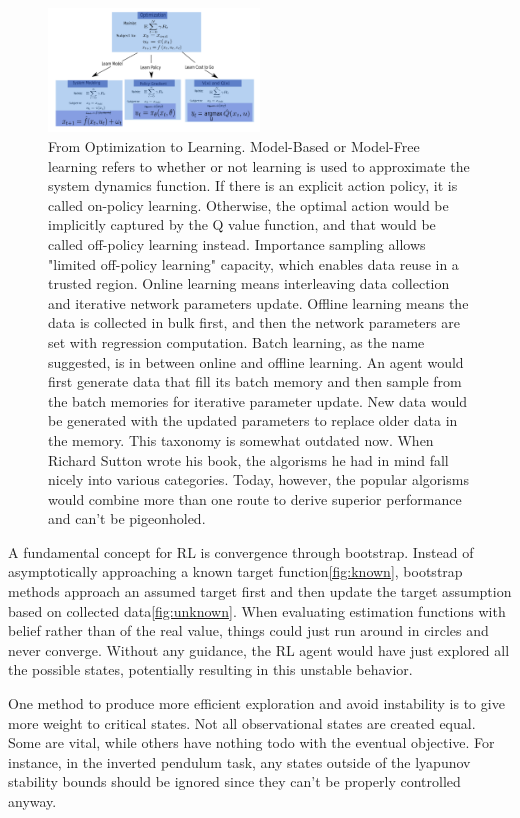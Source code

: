\documentclass[journal]{IEEEtran}
\begin{document}
\begin{figure}
    \centering
    \includegraphics[width=0.5\textwidth]{Control.png}
    \caption{From Optimization to Learning. Model-Based or Model-Free learning refers to whether or not learning is used to approximate the system dynamics function. If there is an explicit action policy, it is called on-policy learning. Otherwise, the optimal action would be implicitly captured by the Q value function, and that would be called off-policy learning instead. Importance sampling allows "limited off-policy learning" capacity, which enables data reuse in a trusted region. Online learning means interleaving data collection and iterative network parameters update. Offline learning means the data is collected in bulk first, and then the network parameters are set with regression computation. Batch learning, as the name suggested, is in between online and offline learning. An agent would first generate data that fill its batch memory and then sample from the batch memories for iterative parameter update. New data would be generated with the updated parameters to replace older data in the memory. This taxonomy is somewhat outdated now. When Richard Sutton wrote his book, the algorisms he had in mind fall nicely into various categories. Today, however, the popular algorisms would combine more than one route to derive superior performance and can't be pigeonholed.}
    \label{fig:rl}
\end{figure} 

A fundamental concept for RL is convergence through bootstrap. Instead of asymptotically approaching a known target function\ref{fig:known}, bootstrap methods approach an assumed target first and then update the target assumption based on collected data\ref{fig:unknown}. When evaluating estimation functions with belief rather than of the real value, things could just run around in circles and never converge. Without any guidance, the RL agent would have just explored all the possible states, potentially resulting in this unstable behavior. 

One method to produce more efficient exploration and avoid instability is to give more weight to critical states. Not all observational states are created equal. Some are vital, while others have nothing todo with the eventual objective. For instance, in the inverted pendulum task, any states outside of the lyapunov stability bounds should be ignored since they can't be properly controlled anyway. 
\end{document}
